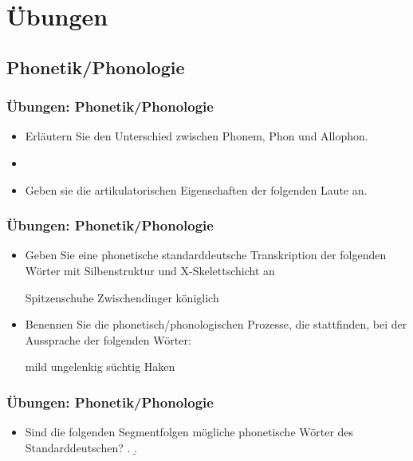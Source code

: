 \section{Übungen}

\subsection{Phonetik/Phonologie}
\begin{frame}
\frametitle{Übungen: Phonetik/Phonologie}

\begin{itemize}
	\item Erläutern Sie den Unterschied zwischen Phonem, Phon und Allophon.
	\item[]	
	\item Geben sie die artikulatorischen Eigenschaften der folgenden Laute an.
	
	\eal
	\ex \textipa{[r]}
	\ex \textipa{[P]}
	\ex \textipa{[b]}
	\ex \textipa{[x]}
	\zl

\end{itemize}

\end{frame}


\begin{frame}
\frametitle{Übungen: Phonetik/Phonologie}

\begin{itemize}
	\item Geben Sie eine phonetische standarddeutsche Transkription der folgenden Wörter mit Silbenstruktur und X-Skelettschicht an
	
	\eal
	\ex Spitzenschuhe
	\ex Zwischendinger
	\ex königlich	
	\zl

	\item Benennen Sie die phonetisch/phonologischen Prozesse, die stattfinden, bei der Aussprache der folgenden Wörter:
	
	\eal
	\ex mild
	\ex ungelenkig
	\ex süchtig
	\ex Haken
	\zl


\end{itemize}

\end{frame}


\begin{frame}
\frametitle{Übungen: Phonetik/Phonologie}

\begin{itemize}
	\item Sind die folgenden Segmentfolgen mögliche phonetische Wörter des Standarddeutschen?
	\a. 	
	\b. \textipa{[Ne:."nt@g]}
	
	
\end{itemize}

\end{frame}


